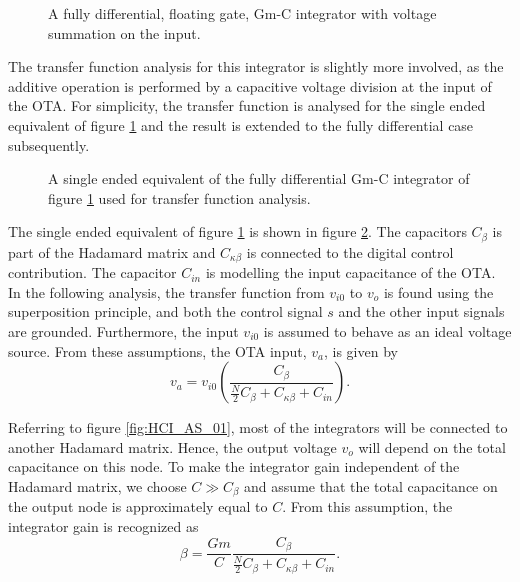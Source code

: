 \begin{figure}[htbp]
    \centering
    
    \caption{A fully differential, floating gate, Gm-C integrator with voltage summation on the input.}
    \label{fig:GmCint}
\end{figure}

The transfer function analysis for this integrator is slightly more involved, as the additive operation is performed by a capacitive voltage division at the input of the OTA. For simplicity, the transfer function is analysed for the single ended equivalent of figure \ref{fig:GmCint} and the result is extended to the fully differential case subsequently.

\begin{figure}[htbp]
    \centering
    
    \caption{A single ended equivalent of the fully differential Gm-C integrator of figure \ref{fig:GmCint} used for transfer function analysis.}
    \label{fig:GmCint_single_ended}
\end{figure}

The single ended equivalent of figure \ref{fig:GmCint} is shown in figure \ref{fig:GmCint_single_ended}. The capacitors $C_\beta$ is part of the Hadamard matrix and $C_{\kappa\beta}$ is connected to the digital control contribution. The capacitor $C_{in}$ is modelling the input capacitance of the OTA. In the following analysis, the transfer function from $v_{i0}$ to $v_o$ is found using the superposition principle, and both the control signal $s$ and the other input signals are grounded. Furthermore, the input $v_{i0}$ is assumed to behave as an ideal voltage source. From these assumptions, the OTA input, $v_a$, is given by
\begin{equation}
    v_a = v_{i0} \left( \frac{C_\beta}{\frac{N}{2}C_\beta + C_{\kappa\beta} + C_{in}} \right).
\end{equation}

Referring to figure \ref{fig:HCI_AS_01}, most of the integrators will be connected to another Hadamard matrix. Hence, the output voltage $v_o$ will depend on the total capacitance on this node. To make the integrator gain independent of the Hadamard matrix, we choose $C \gg C_\beta$ and assume that the total capacitance on the output node is approximately equal to $C$. From this assumption, the integrator gain is recognized as
\begin{equation}
    \label{eq:beta_GmC}
    \beta = \frac{Gm}{C}\frac{C_\beta}{\frac{N}{2}C_\beta + C_{\kappa\beta} + C_{in}}.
\end{equation}

